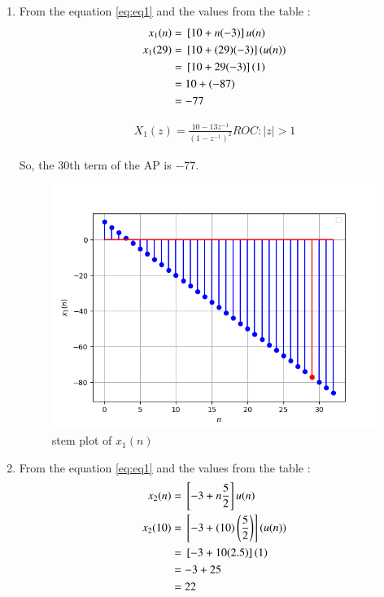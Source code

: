 \documentclass[journal,12pt,twocolumn]{IEEEtran}
\theoremstyle{remark}
\begin{document}
\begin{enumerate}
\item From the equation \eqref{eq:eq1} and the values from the table  :
\begin{align}
x_1(n) &= {}\left[10 + n(-3)\right]u(n)\\
x_1(29) &= {}\left[10 + (29)(-3)\right](u(n))\\
&= {}\left[10 + 29(-3)\right](1)\\
&= 10+ (-87)  \\
&= -77
\end{align}
               
\begin{align}
X_1(z) = \frac{10 - 13z^{-1}}{(1-z^{-1})^2} {ROC : |z| > 1}
\end{align}

So, the 30th term of the AP is $-77$.\\
\begin{figure}[h!]
    \centering
    \includegraphics[width=\columnwidth]{figs/plot1.png}
    \caption{stem plot of $x_1(n)$}
    \label{fig:1}
\end{figure}

\item From the equation \eqref{eq:eq1} and the values from the table  :
\begin{align}
x_2(n) &= {}\left[-3 + n\frac{5}{2}\right]u(n)\\
x_2(10) &= {}\left[-3 + (10)\left(\frac{5}{2}\right)\right](u(n))\\
&= {}\left[-3 + 10(2.5)\right](1)\\
& = -3 + 25 \\
&= 22
\end{align}


\end{enumerate}
\end{document}
